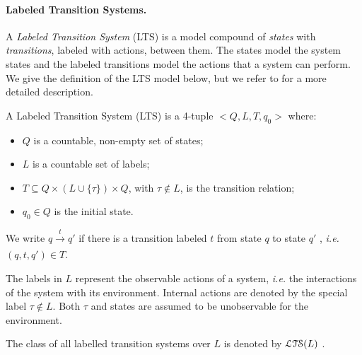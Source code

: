 \paragraph{Labeled Transition Systems.}
\label{sec:definitions:lts}

A \textit{Labeled Transition System} (LTS)
\cite{milner1980calculus} is a model compound of \emph{states}
with \emph{transitions}, labeled with actions, between them.  The
states model the system states and the labeled transitions model
the actions that a system can perform.  We give the definition of
the LTS model below, but we refer to \cite{Tre96,ltsTretmans} for
a more detailed description.

\begin{definition}
    A Labeled Transition System (LTS) is a 4-tuple $<Q,L,T,q_0>$
    where:

    \begin{itemize}
    \item $Q$ is a countable, non-empty set of states;

    \item $L$ is a countable set of labels;

    \item $T \subseteq Q \times (L \cup \{\tau\}) \times Q$, with
    $\tau \not\in L$, is the transition relation;

    \item $q_0 \in Q$ is the initial state.

    \end{itemize}

    We write $q \xrightarrow[]{t} q'$ if there is a transition
    labeled $t$ from state $q$ to state $q'$ , \emph{i.e.} $(q,
    t, q') \in T$.

    The labels in $L$ represent the observable actions of a
    system, \emph{i.e.} the interactions of the system with its
    environment.  Internal actions are denoted by the special
    label $\tau \not\in L$. Both $\tau$ and states are assumed to
    be unobservable for the environment.

    The class of all labelled transition systems over $L$ is
    denoted by $\EuScript{LTS}(L)$ \cite{Tre96}.

	\label{def:lts}
\end{definition}

